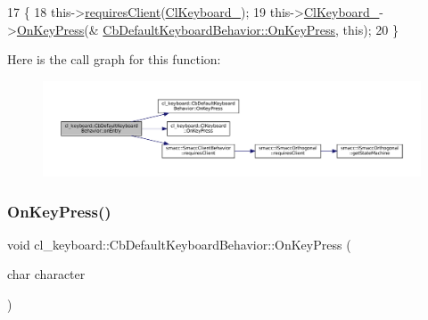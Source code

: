 \begin{DoxyCode}
17     \{
18         this->\hyperlink{classsmacc_1_1SmaccClientBehavior_a917f001e763a1059af337bf4e164f542}{requiresClient}(\hyperlink{classcl__keyboard_1_1CbDefaultKeyboardBehavior_a482e94248b8e6fbac0973d3dec0cc20b}{ClKeyboard\_});
19         this->\hyperlink{classcl__keyboard_1_1CbDefaultKeyboardBehavior_a482e94248b8e6fbac0973d3dec0cc20b}{ClKeyboard\_}->\hyperlink{classcl__keyboard_1_1ClKeyboard_ae9f4a6dc1ce18397394a432826970baa}{OnKeyPress}(&
      \hyperlink{classcl__keyboard_1_1CbDefaultKeyboardBehavior_aa834f8e626a306920e536e7535041ac3}{CbDefaultKeyboardBehavior::OnKeyPress}, \textcolor{keyword}{this});
20     \}
\end{DoxyCode}
Here is the call graph for this function\+:
\nopagebreak
\begin{figure}[H]
\begin{center}
\leavevmode
\includegraphics[width=350pt]{classcl__keyboard_1_1CbDefaultKeyboardBehavior_a06e49d8c78aeffecf74c27b05f529a3a_cgraph}
\end{center}
\end{figure}
\mbox{\label{classcl__keyboard_1_1CbDefaultKeyboardBehavior_aa834f8e626a306920e536e7535041ac3}} 
\subsubsection{\texorpdfstring{On\+Key\+Press()}{OnKeyPress()}}
{\footnotesize\ttfamily void cl\+\_\+keyboard\+::\+Cb\+Default\+Keyboard\+Behavior\+::\+On\+Key\+Press (\begin{DoxyParamCaption}\item[{char}]{character }\end{DoxyParamCaption})\hspace{0.3cm}{\ttfamily [inline]}}



